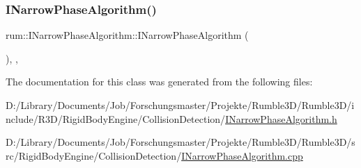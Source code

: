 \subsubsection{\texorpdfstring{I\+Narrow\+Phase\+Algorithm()}{INarrowPhaseAlgorithm()}}
{\footnotesize\ttfamily rum\+::\+I\+Narrow\+Phase\+Algorithm\+::\+I\+Narrow\+Phase\+Algorithm (\begin{DoxyParamCaption}{ }\end{DoxyParamCaption})\hspace{0.3cm}{\ttfamily [explicit]}, {\ttfamily [protected]}, {\ttfamily [default]}}



The documentation for this class was generated from the following files\+:\begin{DoxyCompactItemize}
\item 
D\+:/\+Library/\+Documents/\+Job/\+Forschungsmaster/\+Projekte/\+Rumble3\+D/\+Rumble3\+D/include/\+R3\+D/\+Rigid\+Body\+Engine/\+Collision\+Detection/\mbox{\hyperlink{_i_narrow_phase_algorithm_8h}{I\+Narrow\+Phase\+Algorithm.\+h}}\item 
D\+:/\+Library/\+Documents/\+Job/\+Forschungsmaster/\+Projekte/\+Rumble3\+D/\+Rumble3\+D/src/\+Rigid\+Body\+Engine/\+Collision\+Detection/\mbox{\hyperlink{_i_narrow_phase_algorithm_8cpp}{I\+Narrow\+Phase\+Algorithm.\+cpp}}\end{DoxyCompactItemize}
